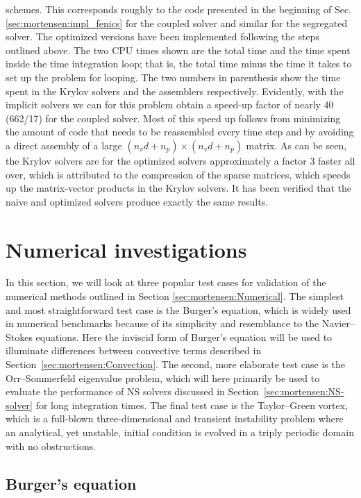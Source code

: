schemes. This corresponds roughly to the code presented in the
beginning of Sec. \ref{sec:mortensen:impl_fenics} for the coupled
solver and similar for the segregated solver. The optimized versions
have been implemented following the steps outlined above. The two CPU
times shown are the total time and the time spent inside the time
integration loop; that is, the total time minus the time it takes to set
up the problem for looping. The two numbers in parenthesis show the
time spent in the Krylov solvers and the assemblers
respectively. Evidently, with the implicit solvers we can for this
problem obtain a speed-up factor of nearly 40 (662/17) for the coupled
solver. Most of this speed up follows from minimizing the amount of
code that needs to be reassembled every time step and by avoiding a
direct assembly of a large $(n_vd+n_p)\times (n_vd+n_p)$ matrix. As
can be seen, the Krylov solvers are for the optimized solvers
approximately a factor 3 faster all over, which is attributed to the
compression of the sparse matrices, which speeds up the matrix-vector
products in the Krylov solvers. It has been verified that the naive
and optimized solvers produce exactly the same results.

\section{Numerical investigations}
\label{sec:mortensen:testcases}

In this section, we will look at three popular test cases for
validation of the numerical methods outlined in Section
\ref{sec:mortensen:Numerical}. The simplest and most straightforward
test case is the Burger's equation, which is widely used in numerical
benchmarks because of its simplicity and resemblance to the
Navier--Stokes equations. Here the inviscid form of Burger's equation
will be used to illuminate differences between convective terms
described in Section~\ref{sec:mortensen:Convection}. The second, more
elaborate test case is the Orr--Sommerfeld eigenvalue problem, which
will here primarily be used to evaluate the performance of NS solvers
discussed in Section~\ref{sec:mortensen:NS-solver} for long
integration times. The final test case is the Taylor--Green vortex,
which is a full-blown three-dimensional and transient instability
problem where an analytical, yet unstable, initial condition is
evolved in a triply periodic domain with no obstructions.

\subsection{Burger's equation}
\label{sec:mortensen:burgers}

